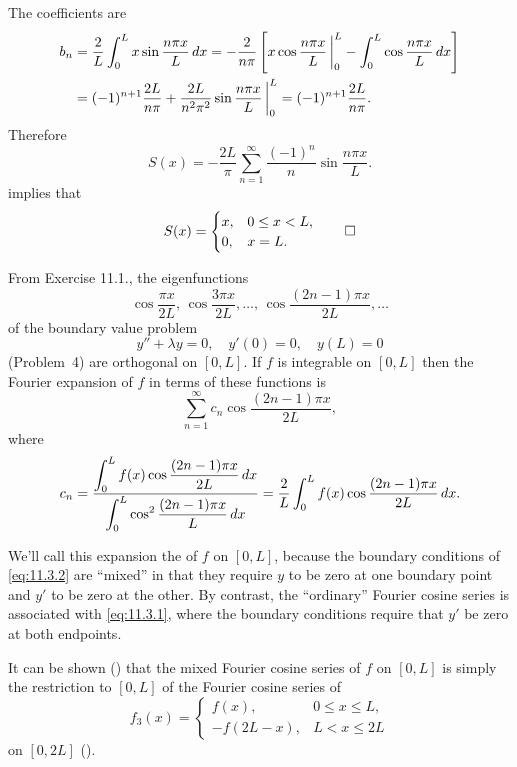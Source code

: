 \begin{solution}
 The coefficients are
\begin{align*}
b_n&=\frac{2}{L}\int_0^Lx\sin\frac{n\pi x}{L}\,dx
=-\frac{2}{n\pi}\left[x\cos\frac{n\pi x}{L}\,\bigg|_{0}^{L}-
\int_0^L
\cos\frac{n\pi x}{L}\,dx\right]\\
&= (-1)^{n+1}\frac{2L}{n\pi}+\frac{2L}{n^2\pi^2}\sin\frac{n\pi x}{L}\,\bigg|_{0}^{L} =(-1)^{n+1}\frac{2L}{n\pi}.
\end{align*}
Therefore
\[
S(x)=-\frac{2L}{\pi}\sum_{n=1}^\infty\frac{(-1)^n}{n}
\sin\frac{n\pi x}{L}.
\]
 implies that
\[
S(x)=
\begin{cases}
x,&0\le x< L,\\0,& x=L.
\end{cases}\qedhere
\]
\end{solution}



From {Exercise 11.1.}, the eigenfunctions
\[
 \cos\frac{\pi x}{2L},
\, \cos\frac{3\pi x}{2L},\dots,
 \, \cos\frac{(2n-1)\pi x}{2L},\dots
\]
 of the boundary value problem
\begin{equation} \label{eq:11.3.2}
y''+\lambda y=0,\quad y'(0)=0,\quad y(L)=0
\end{equation}
(Problem~4) are orthogonal on $[0,L]$.
 If $f$ is integrable on $[0,L]$ then the
Fourier expansion of $f$ in terms of these functions  is
\[
\sum_{n=1}^\infty c_n\cos\frac{(2n-1)\pi x}{2L},
\]
where
\[
c_n=\frac{\displaystyle\int_0^Lf(x)\cos\frac{(2n-1)\pi x}{2L}\,dx}{\displaystyle\int_0^L
\cos^2\frac{(2n-1)\pi x}{L}\,dx}=\frac{2}{L}\int_0^Lf(x)\cos\frac{(2n-1)\pi
x}{2L}\,dx.
\]

We'll  call this expansion the  of $f$ on $[0,L]$, because the boundary conditions
of \eqref{eq:11.3.2} are ``mixed'' in that they require $y$
to be zero at
 one boundary point and $y'$ to be  zero at the other. By contrast,
the ``ordinary'' Fourier cosine series is associated with
\eqref{eq:11.3.1}, where the boundary conditions require that $y'$
be zero at both endpoints.

It can be shown () that
 the mixed Fourier cosine series
of $f$ on $[0,L]$
is simply the restriction to  $[0,L]$ of the Fourier
cosine series  of
\[
f_3(x)=
\begin{cases}
f(x),&0\le x\le L,\\-f(2L-x),&L< x\le 2L
\end{cases}
\]
on $[0,2L]$ ().

